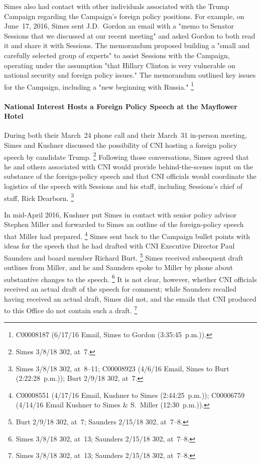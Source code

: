 Simes also had contact with other individuals associated with the Trump Campaign regarding the Campaign's foreign policy positions.
For example, on June~17, 2016, Simes sent J.D.~Gordon an email with a "memo to Senator Sessions that we discussed at our recent meeting" and asked Gordon to both read it and share it with Sessions.
The memorandum proposed building a "small and carefully selected group of experts" to assist Sessions with the Campaign, operating under the assumption "that Hillary Clinton is very vulnerable on national security and foreign policy issues."
The memorandum outlined key issues for the Campaign, including a "new beginning with Russia."%
\footnote{C00008187 (6/17/16 Email, Simes to Gordon (3:35:45~p.m.)).}

\paragraph{National Interest Hosts a Foreign Policy Speech at the Mayflower Hotel}

During both their March~24 phone call and their March~31 in-person meeting, Simes and Kushner discussed the possibility of CNI hosting a foreign policy speech by candidate Trump.%
\footnote{Simes 3/8/18 302, at~7.}
Following those conversations, Simes agreed that he and others associated with CNI would provide behind-the-scenes input on the substance of the foreign-policy speech and that CNI officials would coordinate the logistics of the speech with Sessions and his staff, including Sessions's chief of staff, Rick Dearborn.%
\footnote{Simes 3/8/18 302, at~8--11;
C00008923 (4/6/16 Email, Simes to Burt (2:22:28~p.m.));
Burt 2/9/18 302, at~7.}

In mid-April 2016, Kushner put Simes in contact with senior policy advisor Stephen Miller and forwarded to Simes an outline of the foreign-policy speech that Miller had prepared.%
\footnote{C00008551 (4/17/16 Email, Kushner to Simes (2:44:25~p.m.));
C00006759 (4/14/16 Email Kushner to Simes \& S.~Miller (12:30~p.m.)).}
Simes sent back to the Campaign bullet points with ideas for the speech that he had drafted with CNI Executive Director Paul Saunders and board member Richard Burt.%
\footnote{Burt 2/9/18 302, at~7;
Saunders 2/15/18 302, at~7--8.}
Simes received subsequent draft outlines from Miller, and he and Saunders spoke to Miller by phone about substantive changes to the speech.%
\footnote{Simes 3/8/18 302, at~13;
Saunders 2/15/18 302, at~7--8.}
It is not clear, however, whether CNI officials received an actual draft of the speech for comment; while Saunders recalled having received an actual draft, Simes did not, and the emails that CNI produced to this Office do not contain such a draft.%
\footnote{Simes 3/8/18 302, at~13;
Saunders 2/15/18 302, at~7--8.}

